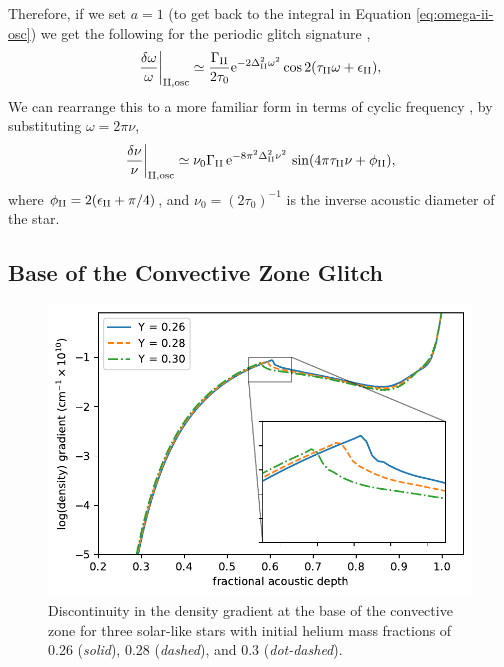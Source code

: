 %
Therefore, if we set \(a = 1\) (to get back to the integral in Equation \ref{eq:omega-ii-osc}) we get the following for the periodic glitch signature \citep[cf.][Eq. 15]{Houdek.Gough2007},
%
\begin{equation}
    \left.\frac{\delta\omega}{\omega}\right|_{{\mathrm{II}}, \mathrm{osc}} \simeq \frac{\Gamma_{{\mathrm{II}}}}{2 \tau_0} \mathrm{e}^{- 2 \Delta_{{\mathrm{II}}}^2 \omega^2} \cos 2 (\tau_{{\mathrm{II}}}\omega + \epsilon_{{\mathrm{II}}}),
\end{equation}
%
We can rearrange this to a more familiar form in terms of cyclic frequency \citep[e.g.][]{Verma.Faria.ea2014,Verma.Raodeo.ea2017}, by substituting \(\omega = 2\pi\nu\),
%
\begin{equation}
    \left.\frac{\delta\nu}{\nu}\right|_{{\mathrm{II}}, \mathrm{osc}} \simeq \nu_0 \Gamma_{{\mathrm{II}}} \, \mathrm{e}^{- 8 \pi^2 \Delta_{{\mathrm{II}}}^2 \nu^2} \, \sin ( 4 \pi \tau_{{\mathrm{II}}} \nu + \phi_{{\mathrm{II}}}), \label{eq:he-osc}
\end{equation}
%
where \(\phi_{{\mathrm{II}}} = 2(\epsilon_{{\mathrm{II}}} + \pi/4)\), and \(\nu_0 = (2 \tau_0)^{-1}\) is the inverse acoustic diameter of the star.

\subsection{Base of the Convective Zone Glitch}\label{sec:bcz-glitch}

\begin{figure}[tb]
    \centering
    \includegraphics{figures/bcz-density-gradient.pdf}
    \caption[Discontinuity in the density gradient at the base of the convective zone for three solar-like model stars.]{Discontinuity in the density gradient at the base of the convective zone for three solar-like stars with initial helium mass fractions of 0.26 (\emph{solid}), 0.28 (\emph{dashed}), and 0.3 (\emph{dot-dashed}).}
    \label{fig:bcz-density}
\end{figure}

